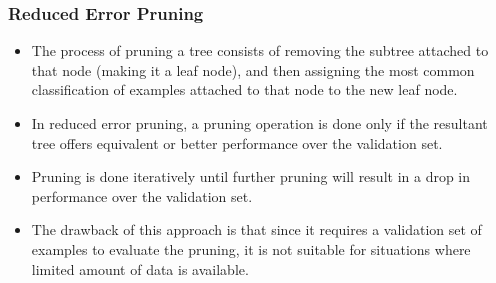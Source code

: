 \documentclass{article}
\theoremstyle{plain}
\theoremstyle{definition}
\begin{document}
\subsubsection{Reduced Error Pruning}
\begin{itemize}
    \item The process of pruning a tree consists of removing the subtree attached to that node (making it a leaf node), and then assigning the most common classification of examples attached to that node to the new leaf node. 
    
    \item In reduced error pruning, a pruning operation is done only if the resultant tree offers equivalent or better performance over the validation set. 
    
    \item Pruning is done iteratively until further pruning will result in a drop in performance over the validation set. 
    
    \item The drawback of this approach is that since it requires a validation set of examples to evaluate the pruning, it is not suitable for situations where limited amount of data is available. 
\end{itemize}
\end{document}
